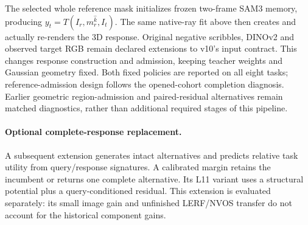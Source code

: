 The selected whole reference mask initializes frozen two-frame SAM3 memory,
producing $y_t=T(I_r,m_r^{\hat k},I_t)$. The same native-ray fit above then
creates and actually re-renders the 3D response. Original negative scribbles,
DINOv2 and observed target RGB remain declared extensions to v10's input contract.
This changes response construction and admission, keeping teacher weights and
Gaussian geometry fixed. Both fixed policies are reported on all eight tasks;
reference-admission design follows the opened-cohort completion diagnosis.
Earlier geometric region-admission and paired-residual alternatives remain
matched diagnostics, rather than additional required stages of this pipeline.

\paragraph{Optional complete-response replacement.}
A subsequent extension generates intact alternatives and predicts relative task
utility from query/response signatures. A calibrated margin retains the
incumbent or returns one complete alternative. Its L11 variant uses a structural
potential plus a query-conditioned residual. This extension is evaluated
separately: its small image gain and unfinished LERF/NVOS transfer do not account
for the historical component gains.
